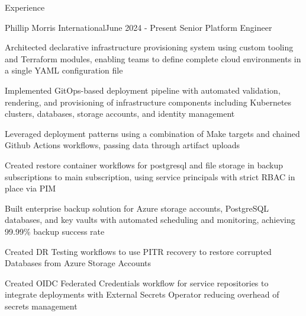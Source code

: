 \documentclass{resume} %
\begin{document}

\begin{rSection}{Experience}
\smallbreak

\begin{rSubsection}{Phillip Morris International}{June 2024 - Present}
{Senior Platform Engineer}{}
\normalfont
\item Architected declarative infrastructure provisioning system using custom tooling and Terraform modules, enabling teams to define complete cloud environments in a single YAML configuration file
\item Implemented GitOps-based deployment pipeline with automated validation, rendering, and provisioning of infrastructure components including Kubernetes clusters, databases, storage accounts, and identity management
\item Leveraged deployment patterns using a combination of Make targets and chained Github Actions workflows, passing data through artifact uploads
\item Created restore container workflows for postgresql and file storage in backup subscriptions to main subscription, using service principals with strict RBAC in place via PIM
\item Built enterprise backup solution for Azure storage accounts, PostgreSQL databases, and key vaults with automated scheduling and monitoring, achieving 99.99\% backup success rate
\item Created DR Testing workflows to use PITR recovery to restore corrupted Databases from Azure Storage Accounts
\item Created OIDC Federated Credentials workflow for service repositories to integrate deployments with External Secrets Operator reducing overhead of secrets management
\end{rSubsection}


\end{rSection}
\end{document}
